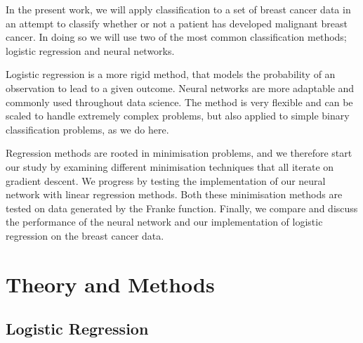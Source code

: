 \documentclass[a4paper, 
amsfonts, 
amssymb, 
amsmath, 
reprint, 
showkeys, 
nofootinbib, 
twoside]{revtex4-2}
\begin{document}
In the present work, we will apply classification to a set of breast cancer data in an attempt to classify whether or not a patient has developed malignant breast cancer. In doing so we will use two of the most common classification methods; logistic regression and neural networks. 

Logistic regression is a more rigid method, that models the probability of an observation to lead to a given outcome. Neural networks are more adaptable and commonly used throughout data science. The method is very flexible and can be scaled to handle extremely complex problems, but also applied to simple binary classification problems, as we do here.

Regression methods are rooted in minimisation problems, and we therefore start our study by examining different minimisation techniques that all iterate on gradient descent. We progress by testing the implementation of our neural network with linear regression methods. Both these minimisation methods are tested on data generated by the Franke function. Finally, we compare and discuss the performance of the neural network and our implementation of logistic regression on the breast cancer data. 

\section{Theory and Methods}

\subsection{Logistic Regression}
\end{document}
